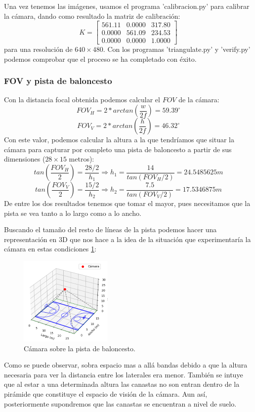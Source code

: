 \documentclass[12pt]{article}
\begin{document}
Una vez tenemos las imágenes, usamos el programa 'calibracion.py' para calibrar la cámara, dando como resultado la matriz de calibración:
$$
K=
\begin{bmatrix}
    561.11 & 0.0000 & 317.80 \\
    0.0000 & 561.09 & 234.53 \\
    0.0000 & 0.0000 & 1.0000
\end{bmatrix}
$$
para una resolución de $640 \times 480$. Con los programas 'triangulate.py' y 'verify.py' podemos comprobar que el proceso se ha completado con éxito.

\subsubsection{FOV y pista de baloncesto}

Con la distancia focal obtenida podemos calcular el $FOV$ de la cámara:
$$FOV_H = 2*arctan \left( \frac{w}{2f} \right) = 59.39^{\circ}$$ 
$$FOV_V = 2*arctan \left( \frac{h}{2f} \right) = 46.32^{\circ}$$
Con este valor, podemos calcular la altura a la que tendríamos que situar la cámara para capturar por completo una pista de baloncesto a partir de sus dimensiones ($28 \times 15$ metros):
$$
tan \left( \frac{FOV_H}{2} \right) = \frac{28/2}{h_1} \Rightarrow h_1 = \frac{14}{tan(FOV_H/2)}=24.5485625m
$$
$$
tan \left( \frac{FOV_V}{2} \right) = \frac{15/2}{h_2} \Rightarrow h_2 = \frac{7.5}{tan(FOV_V/2)}=17.5346875m
$$
De entre los dos resultados tenemos que tomar el mayor, pues necesitamos que la pista se vea tanto a lo largo como a lo ancho.

Buscando el tamaño del resto de líneas de la pista podemos hacer una representación en 3D que nos hace a la idea de la situación que experimentaría la cámara en estas condiciones \ref{fig:pista_basket}:
\begin{figure}[H]
    \centering
    \includegraphics[width=0.4\textwidth]{images_calibracion/Pista_basket.png}
    \caption{Cámara sobre la pista de baloncesto.}
    \label{fig:pista_basket}
\end{figure}
Como se puede observar, sobra espacio mas a allá bandas debido a que la altura necesaria para ver la distancia entre los laterales era menor. 
También se intuye que al estar a una determinada altura las canastas no son entran dentro de la pirámide que constituye el espacio de visión de la cámara.
Aun así, posteriormente supondremos que las canastas se encuentran a nivel de suelo.
\end{document}
